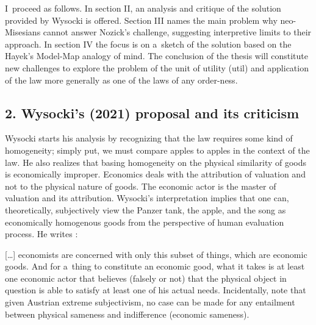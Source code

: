 I~proceed as follows. In section II, an analysis and critique of the solution provided by Wysocki 
\parencite*[][]{} %
 is offered. Section III names the main problem why neo-Misesians cannot answer Nozick's challenge, suggesting interpretive limits to their approach. In section IV the focus is on a~sketch of the solution based on the Hayek's Model-Map analogy of mind. The conclusion of the thesis will constitute new challenges to explore the problem of the unit of utility (util) and application of the law more generally as one of the laws of any order-ness.



\subsection*{2. Wysocki's (2021) proposal and its criticism}



Wysocki starts his analysis by recognizing that the law requires some kind of homogeneity; simply put, we must compare {\textquotedbl}apples to apples{\textquotedbl} in the context of the law. He also realizes that basing homogeneity on the physical similarity of goods is economically improper. Economics deals with the attribution of valuation and not to the physical nature of goods. The economic actor is the master of valuation and its attribution. Wysocki's interpretation implies that one can, theoretically, subjectively view the Panzer tank, the apple, and the song as economically homogenous goods from the perspective of human evaluation process. He writes 
\parencite[][p.14]{}:%




[…] economists are concerned with only this subset of things, which are economic goods. And for a~thing to constitute an economic good, what it takes is at least one economic actor that believes (falsely or not) that the physical object in question is able to satisfy at least one of his actual needs. Incidentally, note that given Austrian extreme subjectivism, no case can be made for any entailment between physical sameness and indifference (economic sameness).



